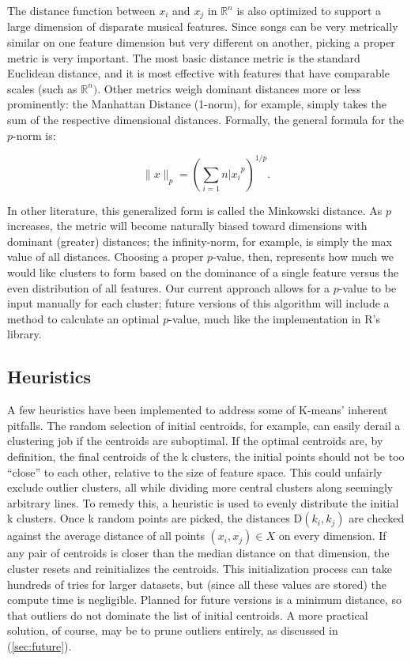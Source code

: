 \documentclass[12pt,twocolumn,titlepage]{article}
\begin{document}
The distance function between $x_i$ and $x_j$ in $\mathbb{R}^n$ is also optimized to support a large dimension of disparate musical features. Since songs can be very metrically similar on one feature dimension but very different on another, picking a proper metric is very important. The most basic distance metric is the standard Euclidean distance, and it is most effective with features that have comparable scales (such as $\mathbb{R}^n)$. \cite{glynn} Other metrics weigh dominant distances more or less prominently: the Manhattan Distance (1-norm), for example, simply takes the sum of the respective dimensional distances. Formally, the general formula for the $p$-norm is:

\begin{equation}\label{}
\|x\|_p = (\sum_{i=1}{n}{|x_i}^p)^{1/p}.
\end{equation}

In other literature, this  generalized form is called the Minkowski distance. \cite{Meyer} As $p$ increases, the metric will become naturally biased toward dimensions with dominant (greater) distances; the infinity-norm, for example, is simply the max value of all distances. Choosing a proper $p$-value, then, represents how much we would like clusters to form based on the dominance of a single feature versus the even distribution of all features. Our current approach allows for a $p$-value to be input manually for each cluster; future versions of this algorithm will include a method to calculate an optimal $p$-value, much like the implementation in R's library. \cite{pvclust}

\subsection{Heuristics}

A few heuristics have been implemented to address some of K-means' inherent pitfalls. The random selection of initial centroids, for example, can easily derail a clustering job if the centroids are suboptimal. If the optimal centroids are, by definition, the final centroids of the k clusters, the initial points should not be too ``close'' to each other, relative to the size of feature space. This could unfairly exclude outlier clusters, all while dividing more central clusters along seemingly arbitrary lines. To remedy this, a heuristic is used to evenly distribute the initial k clusters. \cite{Zerbst} Once k random points are picked, the distances $\mathrm{D}(k_i, k_j)$ are checked against the average distance of all points $(x_i, x_j) \in X$ on every dimension. If any pair of centroids is closer than the median distance on that dimension, the cluster resets and reinitializes the centroids. This initialization process can take hundreds of tries for larger datasets, but (since all these values are stored) the compute time is negligible. Planned for future versions is a minimum distance, so that outliers do not dominate the list of initial centroids. A more practical solution, of course, may be to prune outliers entirely, as discussed in (\ref{sec:future}).
\end{document}
